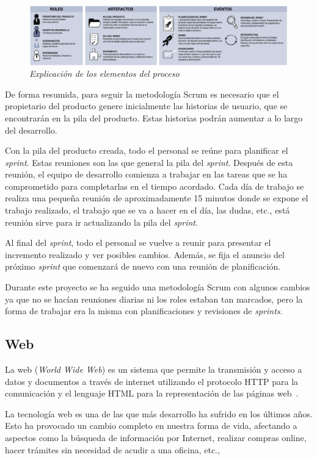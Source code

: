 \begin{figure}
	\centering
	\includegraphics[width=\textwidth]{../img/Scrum/Scrum1.png}
	\caption{\textit{Explicación de los elementos del proceso \cite{scrum}}}\label{ProcesoScrum2}
\end{figure}


De forma resumida, para seguir la metodología Scrum es necesario que el propietario del producto genere inicialmente las historias de usuario, que se encontrarán en la pila del producto. Estas historias podrán aumentar a lo largo del desarrollo.

Con la pila del producto creada, todo el personal se reúne para planificar el \textit{sprint}. Estas reuniones son las que general la pila del \textit{sprint}.
Después de esta reunión, el equipo de desarrollo comienza a trabajar en las tareas que se ha comprometido para completarlas en el tiempo acordado. Cada día de trabajo se realiza una pequeña reunión de aproximadamente 15 minutos donde se expone el trabajo realizado, el trabajo que se va a hacer en el día, las dudas, etc., está reunión sirve para ir actualizando la pila del \textit{sprint}. 

Al final del \textit{sprint}, todo el personal se vuelve a reunir para presentar el incremento realizado y ver posibles cambios. Además, se fija el anuncio del próximo \textit{sprint} que comenzará de nuevo con una reunión de planificación.

Durante este proyecto se ha seguido una metodología Scrum con algunos cambios ya que no se hacían reuniones diarias ni los roles estaban tan marcados, pero la forma de trabajar era la misma con planificaciones y revisiones de \textit{sprints}.

\subsection{Web}
La web (\textit{World Wide Web}) es un sistema que permite la transmisión y acceso a datos y documentos a través de internet utilizando el protocolo HTTP para la comunicación y el lenguaje HTML para la representación de las páginas web~\cite{wiki:web}.

La tecnología web es una de las que más desarrollo ha sufrido en los últimos años. Esto ha provocado un cambio completo en nuestra forma de vida, afectando a aspectos como la búsqueda de información por Internet, realizar compras online, hacer trámites sin necesidad de acudir a una oficina, etc.,


